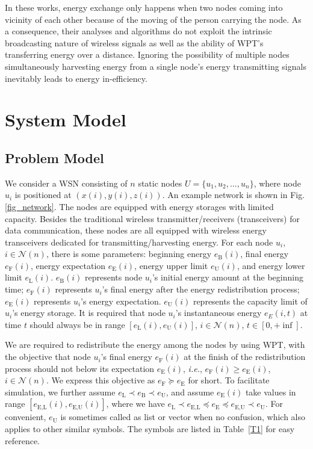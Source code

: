 \documentclass[journal,10pt]{IEEEtran}
\begin{document}
In these works, energy exchange only happens when two nodes coming into vicinity of each other because of the moving of the person carrying the node. As a consequence, their analyses and algorithms do not exploit the intrinsic broadcasting nature of wireless signals as well as the ability of WPT's transferring energy over a distance. Ignoring the possibility of multiple nodes simultaneously harvesting energy from a single node's energy transmitting signals inevitably leads to energy in-efficiency.


\section{System Model}
\label{sec_model}
\subsection{Problem Model}

We consider a WSN consisting of $n$ static nodes $U{=}\{u_1, u_2, \ldots, u_n\}$, where node $u_i$ is positioned at $(x(i),y(i),z(i))$. An example network is shown in Fig.\ref{fig_network}. The nodes are equipped with energy storages with limited capacity. Besides the traditional wireless transmitter/receivers (transceivers) for data communication, these nodes are all equipped with wireless energy transceivers dedicated for transmitting/harvesting energy. For each node $u_i$, $i{\in}\mathcal{N}(n)$, there is some parameters: beginning energy $e_\text{B}(i)$, final energy $e_\text{F}(i)$, energy expectation $e_\text{E}(i)$, energy upper limit $e_\text{U}(i)$, and energy lower limit $e_\text{L}(i)$. $e_\text{B}(i)$ represents node $u_i$'s initial energy amount at the beginning time; $e_\text{F}(i)$ represents $u_i$'s final energy after the energy redistribution process; $e_\text{E}(i)$ represents $u_i$'s energy expectation. $e_\text{U}(i)$ represents the capacity limit of $u_i$'s energy storage. It is required that node $u_i$'s instantaneous energy $e_{E}(i,t)$ at time $t$ should always be in range $[e_\text{L}(i),e_\text{U}(i)]$, $i{\in}\mathcal{N}(n)$, $t{\in}[0,{+}\inf]$.

We are required to redistribute the energy among the nodes by using WPT, with the objective that node $u_i$'s final energy $e_\text{F}(i)$ at the finish of the redistribution process should not below its expectation $e_\text{E}(i)$, \textit{i.e.}, $e_\text{F}(i){\geq}e_\text{E}(i)$, $i{\in}\mathcal{N}(n)$. We express this objective as $e_\text{F}{\succeq}e_\text{E}$ for short. To facilitate simulation, we further assume $e_\text{L}{\prec}e_\text{B}{\prec}e_\text{U}$, and assume $e_\text{E}(i)$ take values in range $[e_\text{E,L}(i),e_\text{E,U}(i)]$, where we have $e_\text{L}{\prec}e_\text{E,L}{\preceq}e_\text{E}{\preceq}e_\text{E,U}{\prec}e_\text{U}$. For convenient, $e_\text{U}$ is sometimes called as list or vector when no confusion, which also applies to other similar symbols. The symbols are listed in Table~\ref{T1} for easy reference.
\end{document}
